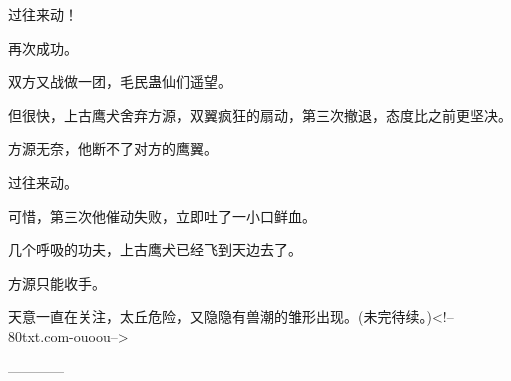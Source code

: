 \begin{this_body}
过往来动！

再次成功。

双方又战做一团，毛民蛊仙们遥望。

但很快，上古鹰犬舍弃方源，双翼疯狂的扇动，第三次撤退，态度比之前更坚决。

方源无奈，他断不了对方的鹰翼。

过往来动。

可惜，第三次他催动失败，立即吐了一小口鲜血。

几个呼吸的功夫，上古鹰犬已经飞到天边去了。

方源只能收手。

天意一直在关注，太丘危险，又隐隐有兽潮的雏形出现。(未完待续。)<!--80txt.com-ouoou-->

------------

\end{this_body}

